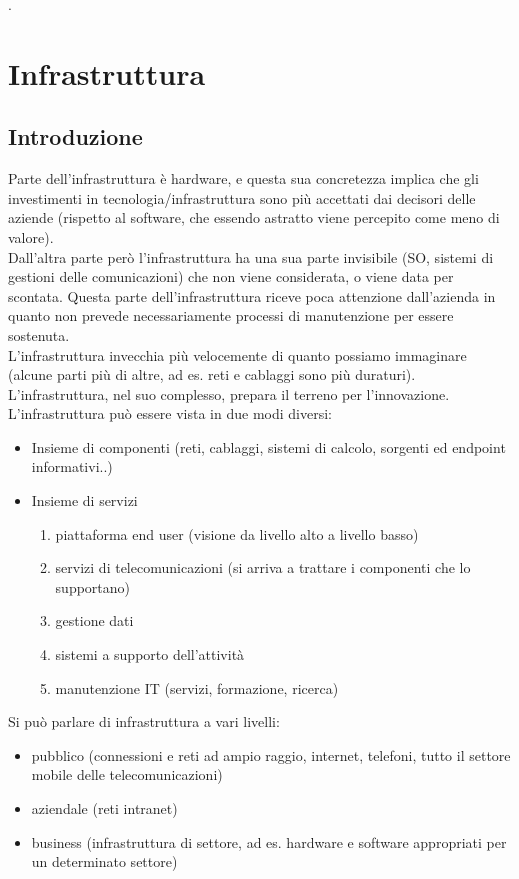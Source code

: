 .%
\chapter{Infrastruttura}
\section{Introduzione}
Parte dell'infrastruttura \`e hardware, e questa sua concretezza implica che gli investimenti in tecnologia/infrastruttura sono pi\`u accettati dai decisori delle aziende (rispetto al software, che essendo astratto viene percepito come meno di valore).\\
Dall'altra parte per\`o l'infrastruttura ha una sua parte invisibile (SO, sistemi di gestioni delle comunicazioni) che non viene considerata, o viene data per scontata. Questa parte dell'infrastruttura riceve poca attenzione dall'azienda in quanto non prevede necessariamente processi di manutenzione per essere sostenuta.\\
L'infrastruttura invecchia pi\`u velocemente di quanto possiamo immaginare (alcune parti pi\`u di altre, ad es. reti e cablaggi sono pi\`u duraturi).
L'infrastruttura, nel suo complesso, prepara il terreno per l'innovazione.
L'infrastruttura pu\`o essere vista in due modi diversi:
\begin{itemize}
\item Insieme di componenti (reti, cablaggi, sistemi di calcolo, sorgenti ed endpoint informativi..)
\item Insieme di servizi
  \begin{enumerate}
\item piattaforma end user (visione da livello alto a livello basso)
\item servizi di telecomunicazioni (si arriva a trattare i componenti che lo supportano)
\item gestione dati
\item sistemi a supporto dell'attivit\`a
\item manutenzione IT (servizi, formazione, ricerca)
\end{enumerate}
\end{itemize}

Si pu\`o parlare di infrastruttura a vari livelli:
\begin{itemize}
\item pubblico (connessioni e reti ad ampio raggio, internet, telefoni, tutto il settore mobile delle telecomunicazioni)
\item aziendale (reti intranet)
\item business (infrastruttura di settore, ad es. hardware e software appropriati per un determinato settore)
\end{itemize}


